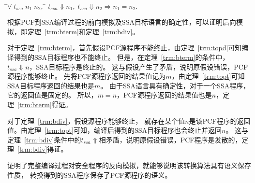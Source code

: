   \begin{theorem}[SSA语言的确定性]\label{trm:ssadeter} 
    \begin{tabbing}
     \\
    \quad\=$\forall \; t_{ssa}\; n_1\; n_2,\; $\=\kill
    \>$t_{ssa}\Downarrow n_1,\; t_{ssa}\Downarrow n_2 \Longrightarrow n_1 = n_2.$
    \end{tabbing}
  \end{theorem}

根据PCF到SSA编译过程的前向模拟及SSA目标语言的确定性，可以证明后向模拟，即定理~\ref{trm:bterm}和定理~\ref{trm:bdiv}。

对于定理~\ref{trm:bterm}，首先假设PCF源程序不能终止，由定理~\ref{trm:topd}可知编译得到的SSA目标程序也不能终止。
但是，在定理~\ref{trm:bterm}的条件中，$t_{ssa}\Downarrow n$，SSA目标程序是终止的。
这与假设产生了矛盾，说明原假设错误，PCF源程序能够终止。
先将PCF源程序返回的结果值记为$m$，由定理~\ref{trm:topt}可知SSA目标程序返回的结果也是$m$。
由于SSA语言具有确定性，对于一个SSA程序，它的返回值是固定的。
所以，$m=n$，PCF源程序返回的结果值也是$n$，定理~\ref{trm:bterm}得证。

对于定理~\ref{trm:bdiv}，假设源程序能够终止，
就存在某个值$n$是该PCF程序的返回值。由定理~\ref{trm:topt}可知，编译后得到的SSA目标程序也会终止并返回$n$。
这与定理~\ref{trm:bdiv}条件中的$t_{ssa}\Uparrow$相矛盾，说明原假设错误，PCF程序是发散的，定理~\ref{trm:bdiv}得证。

证明了完整编译过程对安全程序的反向模拟，就能够说明该转换算法具有语义保存性质，
转换得到的SSA程序保存了PCF源程序的语义。
